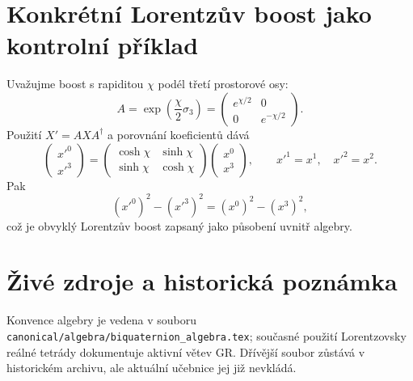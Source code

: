 \section{Konkrétní Lorentzův boost jako kontrolní příklad}
Uvažujme boost s rapiditou $\chi$ podél třetí prostorové osy:
\[
 A=\exp\left(\frac{\chi}{2}\sigma_3\right)
 =\begin{pmatrix}e^{\chi/2}&0\\0&e^{-\chi/2}\end{pmatrix}.
\]
Použití $X'=AXA^\dagger$ a porovnání koeficientů dává
\[
 \begin{pmatrix}x'^0\\x'^3\end{pmatrix}
 =\begin{pmatrix}\cosh\chi&\sinh\chi\\
                  \sinh\chi&\cosh\chi\end{pmatrix}
  \begin{pmatrix}x^0\\x^3\end{pmatrix},
 \qquad x'^1=x^1,\quad x'^2=x^2.
\]
Pak
\[
 (x'^0)^2-(x'^3)^2=(x^0)^2-(x^3)^2,
\]
což je obvyklý Lorentzův boost zapsaný jako působení uvnitř algebry.

\section{Živé zdroje a historická poznámka}
Konvence algebry je vedena v souboru
\texttt{canonical/algebra/biquaternion\_algebra.tex}; současné použití
Lorentzovsky reálné tetrády dokumentuje aktivní větev GR. Dřívější soubor
 zůstává v historickém archivu, ale
aktuální učebnice jej již nevkládá.
